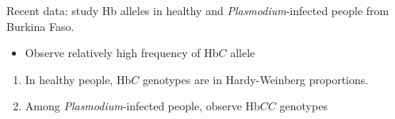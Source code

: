 \begin{frame}[t]
    \begin{adjustwidth}{-2em}{-1.5em}
    Recent data: study Hb alleles in healthy and \textit{Plasmodium}-infected
    people from Burkina Faso.

    \begin{itemize}
        \item<1-> Observe relatively high frequency of Hb$C$ allele
    \end{itemize}

    \begin{enumerate}
        \item<2-> In healthy people, Hb$C$ genotypes are in Hardy-Weinberg
            proportions.

            \vspace{2mm}
        \item<2-> Among \textit{Plasmodium}-infected people, observe
             Hb$CC$ genotypes
    \end{enumerate}

    \end{adjustwidth}
\end{frame}

